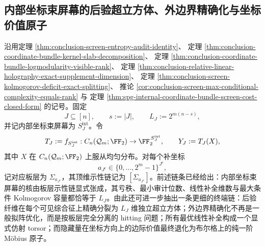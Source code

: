 \subsection{内部坐标束屏幕的后验超立方体、外边界精确化与坐标价值原子}\label{subsec:conclusion-screen-hypercube-boundary-torsor-shapley}

沿用定理 \ref{thm:conclusion-screen-entropy-audit-identity}、
定理 \ref{thm:conclusion-coordinate-bundle-kernel-slab-decomposition}、
定理 \ref{thm:conclusion-coordinate-bundle-logmodularity-visible-rank}、
定理 \ref{thm:conclusion-relative-linear-holography-exact-supplement-dimension}、
定理 \ref{thm:conclusion-screen-kolmogorov-deficit-exact-splitting}、
推论 \ref{cor:conclusion-screen-max-conditional-complexity-equals-rank} 与
定理 \ref{thm:spg-internal-coordinate-bundle-screen-cost-closed-form}
的记号。固定
\[
J\subseteq [n],
\qquad
s:=|J|,
\qquad
L_J:=2^{m(n-s)},
\]
并记内部坐标束屏幕为 \(S_J^{\mathrm{int}}\)。令
\[
T_J:=f_{S_J^{\mathrm{int}}}:C_n(\mathcal Q_m;\FF_2)\to \FF_2^{\,S_J^{\mathrm{int}}},
\qquad
Y_J:=T_J(X),
\]
其中 \(X\) 在 \(C_n(\mathcal Q_m;\FF_2)\) 上服从均匀分布。对每个补坐标
\[
a_{J^c}\in\{0,\dots,2^m-1\}^{J^c},
\]
记对应板层为 \(\Sigma_{a_{J^c}}\)，其顶维示性链记为 \([\Sigma_{a_{J^c}}]\)。前述链条已经给出：内部坐标束屏幕的核由板层示性链显式张成，其亏秩、最小审计位数、线性补全维数与最大条件 Kolmogorov 容量都恰等于 \(L_J\)。由此还可进一步抽出一条更细的终端链：后验纤维在每个可见综合征上精确分裂为 \(L_J\) 维独立超立方体；外边界精确化不再是一般拟阵优化，而是按板层完全分离的 hitting 问题；所有最优线性补全构成一个显式仿射 torsor；而隐藏量在坐标方向上的边际价值最终退化为布尔格上的纯一阶 Möbius 原子。


